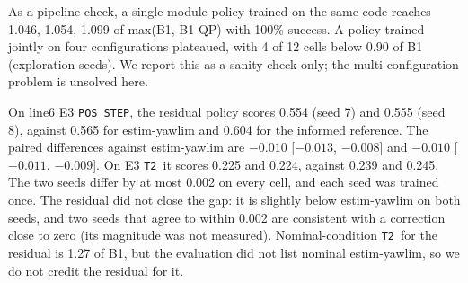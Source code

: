 \documentclass[conference]{IEEEtran}
\newcommand{\POS}{\texttt{POS\_STEP}}
\newcommand{\TT}{\texttt{T2}}
\begin{document}
As a pipeline check, a single-module policy trained on the same code reaches 1.046, 1.054, 1.099 of max(B1, B1-QP) with 100\% success. %
A policy trained jointly on four configurations plateaued, with 4 of 12 cells below 0.90 of B1 (exploration seeds). %
We report this as a sanity check only; the multi-configuration problem is unsolved here.

On line6 E3 \POS, the residual policy scores 0.554 (seed 7) and 0.555 (seed 8), against 0.565 for estim-yawlim and 0.604 for the informed reference. %
The paired differences against estim-yawlim are $-0.010$ [$-0.013$, $-0.008$] and $-0.010$ [$-0.011$, $-0.009$]. %
On E3 \TT\ it scores 0.225 and 0.224, against 0.239 and 0.245. %
The two seeds differ by at most 0.002 on every cell, and each seed was trained once. %
The residual did not close the gap: it is slightly below estim-yawlim on both seeds, and two seeds that agree to within 0.002 are consistent with a correction close to zero (its magnitude was not measured).
Nominal-condition \TT\ for the residual is 1.27 of B1, but the evaluation did not list nominal estim-yawlim, so we do not credit the residual for it. %
\end{document}
